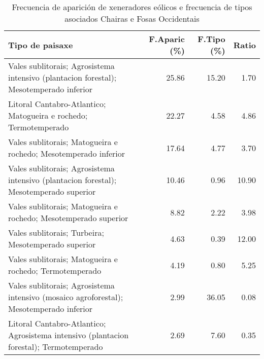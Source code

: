 \begin{table}[p]
\centering
\caption{Frecuencia de aparición de xeneradores eólicos e frecuencia de tipos asociados Chairas e Fosas Occidentais} 
\label{veolico11}
\begin{tabular}{lrrr}
  \hline
Tipo de paisaxe & F.Aparic (\%) & F.Tipo (\%) & Ratio \\ 
  \hline
Vales sublitorais; Agrosistema intensivo (plantacion forestal); Mesotemperado inferior & 25.86 & 15.20 & 1.70 \\ 
  Litoral Cantabro-Atlantico; Matogueira e rochedo; Termotemperado & 22.27 & 4.58 & 4.86 \\ 
  Vales sublitorais; Matogueira e rochedo; Mesotemperado inferior & 17.64 & 4.77 & 3.70 \\ 
  Vales sublitorais; Agrosistema intensivo (plantacion forestal); Mesotemperado superior & 10.46 & 0.96 & 10.90 \\ 
  Vales sublitorais; Matogueira e rochedo; Mesotemperado superior & 8.82 & 2.22 & 3.98 \\ 
  Vales sublitorais; Turbeira; Mesotemperado superior & 4.63 & 0.39 & 12.00 \\ 
  Vales sublitorais; Matogueira e rochedo; Termotemperado & 4.19 & 0.80 & 5.25 \\ 
  Vales sublitorais; Agrosistema intensivo (mosaico agroforestal); Mesotemperado inferior & 2.99 & 36.05 & 0.08 \\ 
  Litoral Cantabro-Atlantico; Agrosistema intensivo (plantacion forestal); Termotemperado & 2.69 & 7.60 & 0.35 \\ 
   \hline
\end{tabular}
\end{table}
